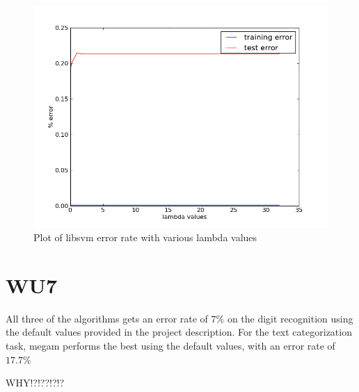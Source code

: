     \begin{figure}
	    \caption{Plot of libsvm error rate with various lambda values}
	    \label{fig:libsvm}
	    \includegraphics[width=6in]{images/wu6_libsvm.png}
    \end{figure}


\section{WU7}
All three of the algorithms gets an error rate of $7\%$ on the digit recognition using the default values provided in the project description. For the text categorization task, megam performs the best using the default values, with an error rate of $17.7\%$

WHY!?!??!?!?


